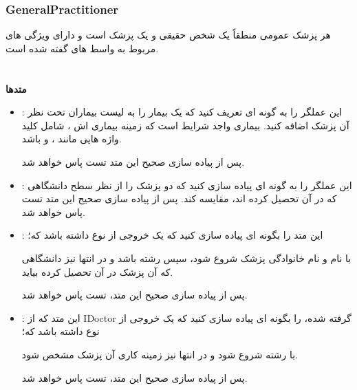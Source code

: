         \subsubsection{GeneralPractitioner}
        هر پزشک عمومی منطقاً یک شخص حقیقی و یک پزشک است و دارای ویژگی های مربوط به 
        واسط های گفته شده
        است.
        \\
        \\
        \\
        \textbf{متدها}
        \begin{itemize}
        \item 
            \grayBox{\textcolor{orange}{Operator +}}
            :
            این عملگر را به گونه ای تعریف کنید که یک بیمار را به لیست بیماران تحت نظر آن پزشک اضافه کنید.
            بیماری واجد شرایط است که زمینه بیماری اش ، شامل 
            کلید واژه هایی مانند 
            \grayBox{\textcolor{red}{Cough}}
            ،
            \grayBox{\textcolor{red}{Sneezing}}
            و
            \grayBox{\textcolor{red}{throat Sore}}
            باشد.
            
            پس از پیاده سازی صحیح این متد تست
            \grayBox{\textcolor{dkgreen}{AddingPatientsToGeneralPractitioner}}
            پاس خواهد شد.

        \item 
            \grayBox{\textcolor{orange}{Operator > / <}}
            :
            این عملگر را به گونه ای پیاده سازی کنید که دو پزشک را از نظر سطح دانشگاهی که در آن تحصیل کرده اند، مقایسه کند.
            پس از پیاده سازی صحیح این متد تست
            \grayBox{\textcolor{dkgreen}{CompareGenerals}}
            پاس خواهد شد.
        \item
            \grayBox{\textcolor{orange}{GraduatedFrom}}
            :
            این متد را بگونه ای پیاده سازی کنید که یک خروجی از نوع 
            \grayBox{\textcolor{blue}{string}}
            داشته باشد که؛
            
            با نام و نام خانوادگی پزشک شروع شود، سپس رشته 
            باشد و در انتها نیز دانشگاهی که آن پزشک در آن تحصیل کرده بیاید.
            
            پس از پیاده سازی صحیح این متد، تست
            \grayBox{\textcolor{dkgreen}{GraduatingGenerals}}
            پاس خواهد شد.
            
        \item
            \grayBox{\textcolor{orange}{Work}}
            :
            این متد که از 
            IDoctor
            گرفته شده،
            را بگونه ای پیاده سازی کنید که یک خروجی از نوع 
            \grayBox{\textcolor{blue}{string}}
            داشته باشد که؛
            
            با رشته
            شروع شود و در انتها نیز زمینه کاری آن پزشک مشخص شود.
            
            پس از پیاده سازی صحیح این متد، تست
            \grayBox{\textcolor{dkgreen}{WorkingGenerals}}
            پاس خواهد شد.
        \end{itemize}
        
